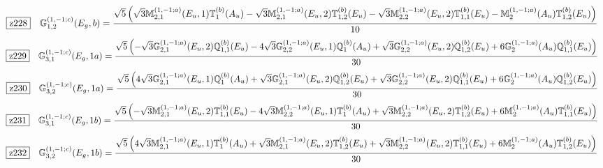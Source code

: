 \documentclass[fleqn,10pt,landscape]{jsarticle}
\begin{document}
\begin{dmath*}
\hspace*{3mm}\fbox{z228}\quad \mathbb{G}_{1,2}^{(1,-1;c)}(E_{g},b)=\frac{\sqrt{5} \left(\sqrt{3} \mathbb{M}_{2,1}^{(1,-1;a)}(E_{u},1) \mathbb{T}_{1}^{(b)}(A_{u}) - \sqrt{3} \mathbb{M}_{2,1}^{(1,-1;a)}(E_{u},2) \mathbb{T}_{1,2}^{(b)}(E_{u}) - \sqrt{3} \mathbb{M}_{2,2}^{(1,-1;a)}(E_{u},2) \mathbb{T}_{1,1}^{(b)}(E_{u}) - \mathbb{M}_{2}^{(1,-1;a)}(A_{u}) \mathbb{T}_{1,2}^{(b)}(E_{u})\right)}{10}
\end{dmath*}
\begin{dmath*}
\hspace*{3mm}\fbox{z229}\quad \mathbb{G}_{3,1}^{(1,-1;c)}(E_{g},1a)=\frac{\sqrt{5} \left(- \sqrt{3} \mathbb{G}_{2,1}^{(1,-1;a)}(E_{u},2) \mathbb{Q}_{1,1}^{(b)}(E_{u}) - 4 \sqrt{3} \mathbb{G}_{2,2}^{(1,-1;a)}(E_{u},1) \mathbb{Q}_{1}^{(b)}(A_{u}) + \sqrt{3} \mathbb{G}_{2,2}^{(1,-1;a)}(E_{u},2) \mathbb{Q}_{1,2}^{(b)}(E_{u}) + 6 \mathbb{G}_{2}^{(1,-1;a)}(A_{u}) \mathbb{Q}_{1,1}^{(b)}(E_{u})\right)}{30}
\end{dmath*}
\begin{dmath*}
\hspace*{3mm}\fbox{z230}\quad \mathbb{G}_{3,2}^{(1,-1;c)}(E_{g},1a)=\frac{\sqrt{5} \left(4 \sqrt{3} \mathbb{G}_{2,1}^{(1,-1;a)}(E_{u},1) \mathbb{Q}_{1}^{(b)}(A_{u}) + \sqrt{3} \mathbb{G}_{2,1}^{(1,-1;a)}(E_{u},2) \mathbb{Q}_{1,2}^{(b)}(E_{u}) + \sqrt{3} \mathbb{G}_{2,2}^{(1,-1;a)}(E_{u},2) \mathbb{Q}_{1,1}^{(b)}(E_{u}) + 6 \mathbb{G}_{2}^{(1,-1;a)}(A_{u}) \mathbb{Q}_{1,2}^{(b)}(E_{u})\right)}{30}
\end{dmath*}
\begin{dmath*}
\hspace*{3mm}\fbox{z231}\quad \mathbb{G}_{3,1}^{(1,-1;c)}(E_{g},1b)=\frac{\sqrt{5} \left(- \sqrt{3} \mathbb{M}_{2,1}^{(1,-1;a)}(E_{u},2) \mathbb{T}_{1,1}^{(b)}(E_{u}) - 4 \sqrt{3} \mathbb{M}_{2,2}^{(1,-1;a)}(E_{u},1) \mathbb{T}_{1}^{(b)}(A_{u}) + \sqrt{3} \mathbb{M}_{2,2}^{(1,-1;a)}(E_{u},2) \mathbb{T}_{1,2}^{(b)}(E_{u}) + 6 \mathbb{M}_{2}^{(1,-1;a)}(A_{u}) \mathbb{T}_{1,1}^{(b)}(E_{u})\right)}{30}
\end{dmath*}
\begin{dmath*}
\hspace*{3mm}\fbox{z232}\quad \mathbb{G}_{3,2}^{(1,-1;c)}(E_{g},1b)=\frac{\sqrt{5} \left(4 \sqrt{3} \mathbb{M}_{2,1}^{(1,-1;a)}(E_{u},1) \mathbb{T}_{1}^{(b)}(A_{u}) + \sqrt{3} \mathbb{M}_{2,1}^{(1,-1;a)}(E_{u},2) \mathbb{T}_{1,2}^{(b)}(E_{u}) + \sqrt{3} \mathbb{M}_{2,2}^{(1,-1;a)}(E_{u},2) \mathbb{T}_{1,1}^{(b)}(E_{u}) + 6 \mathbb{M}_{2}^{(1,-1;a)}(A_{u}) \mathbb{T}_{1,2}^{(b)}(E_{u})\right)}{30}
\end{dmath*}
\end{document}
